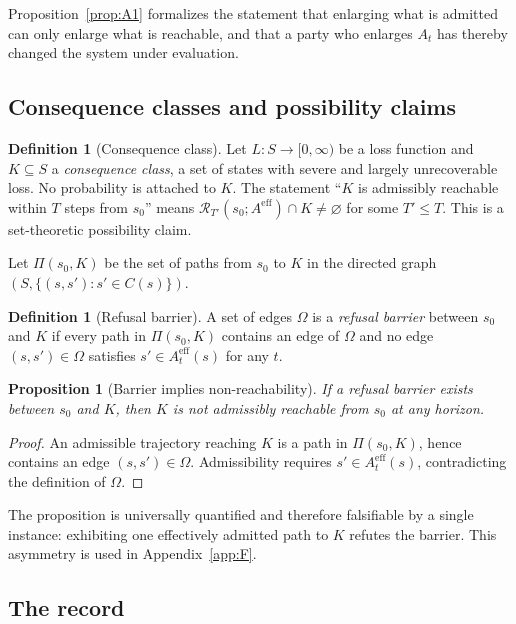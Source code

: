 \documentclass[11pt]{article}
\newtheorem{proposition}[theorem]{Proposition}
\theoremstyle{definition}
\newtheorem{definition}[theorem]{Definition}
\begin{document}
Proposition~\ref{prop:A1} formalizes the statement that enlarging what is admitted can only enlarge what is reachable, and that a party who enlarges $A_t$ has thereby changed the system under evaluation.

\subsection{Consequence classes and possibility claims}

\begin{definition}[Consequence class]
Let $L:S\to[0,\infty)$ be a loss function and $K\subseteq S$ a \emph{consequence class}, a set of states with severe and largely unrecoverable loss. No probability is attached to $K$. The statement ``$K$ is admissibly reachable within $T$ steps from $s_0$'' means $\mathcal{R}_{T'}(s_0;A^{\mathrm{eff}})\cap K\neq\varnothing$ for some $T'\le T$. This is a set-theoretic possibility claim.
\end{definition}

Let $\Pi(s_0,K)$ be the set of paths from $s_0$ to $K$ in the directed graph $(S,\{(s,s'):s'\in C(s)\})$.

\begin{definition}[Refusal barrier]
A set of edges $\Omega$ is a \emph{refusal barrier} between $s_0$ and $K$ if every path in $\Pi(s_0,K)$ contains an edge of $\Omega$ and no edge $(s,s')\in\Omega$ satisfies $s'\in A_t^{\mathrm{eff}}(s)$ for any $t$.
\end{definition}

\begin{proposition}[Barrier implies non-reachability]\label{prop:A2}
If a refusal barrier exists between $s_0$ and $K$, then $K$ is not admissibly reachable from $s_0$ at any horizon.
\end{proposition}
\begin{proof}
An admissible trajectory reaching $K$ is a path in $\Pi(s_0,K)$, hence contains an edge $(s,s')\in\Omega$. Admissibility requires $s'\in A_t^{\mathrm{eff}}(s)$, contradicting the definition of $\Omega$.
\end{proof}

The proposition is universally quantified and therefore falsifiable by a single instance: exhibiting one effectively admitted path to $K$ refutes the barrier. This asymmetry is used in Appendix~\ref{app:F}.

\subsection{The record}
\end{document}
